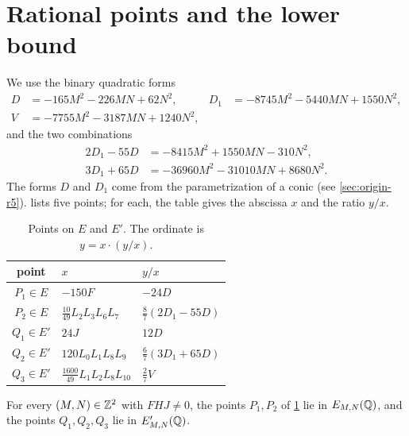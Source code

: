 \section{Rational points and the lower bound}\label{sec:r5-points}

We use the binary quadratic forms
\begin{equation}\label{r5:quadratics}
\begin{aligned}
D&=-165M^2-226MN+62N^2, & D_1&=-8745M^2-5440MN+1550N^2,\\
V&=-7755M^2-3187MN+1240N^2, &&
\end{aligned}
\end{equation}
and the two combinations
\[
\begin{aligned}
2D_1-55D&=-8415M^2+1550MN-310N^2,\\
3D_1+65D&=-36960M^2-31010MN+8680N^2.
\end{aligned}
\]
The forms $D$ and $D_1$ come from the parametrization of a conic (see \cref{sec:origin-r5}).  lists five points; for each, the table gives the abscissa $x$ and the ratio $y/x$.

\begin{table}[htbp]
\centering
\caption{Points on $E$ and $E'$. The ordinate is $y=x\cdot(y/x)$.}\label{tab:r5-points}
\begin{tabular}{cll}
\toprule
point & $x$ & $y/x$\\
\midrule
$P_1\in E$ & $-150F$ & $-24D$\\
$P_2\in E$ & $\tfrac{10}{49}L_2L_3L_6L_7$ & $\tfrac87(2D_1-55D)$\\
$Q_1\in E'$ & $24J$ & $12D$\\
$Q_2\in E'$ & $120L_0L_1L_8L_9$ & $\tfrac67(3D_1+65D)$\\
$Q_3\in E'$ & $\tfrac{1600}{49}L_1L_2L_8L_{10}$ & $\tfrac27V$\\
\bottomrule
\end{tabular}
\end{table}

\begin{lemma}[Points]\label{lem:r5-points}
For every $(M,N)\in\mathbb Z^2$ with $FHJ\ne0$, the points $P_1,P_2$ of \cref{tab:r5-points} lie in $E_{M,N}(\mathbb Q)$, and the points $Q_1,Q_2,Q_3$ lie in $E'_{M,N}(\mathbb Q)$.
\end{lemma}

